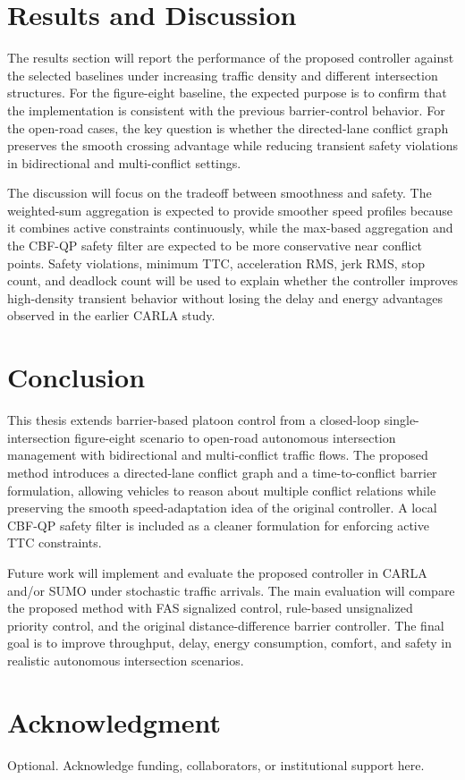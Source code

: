 \documentclass[conference]{IEEEtran}
\begin{document}
\section{Results and Discussion}
The results section will report the performance of the proposed controller against the selected baselines under increasing traffic density and different intersection structures. For the figure-eight baseline, the expected purpose is to confirm that the implementation is consistent with the previous barrier-control behavior. For the open-road cases, the key question is whether the directed-lane conflict graph preserves the smooth crossing advantage while reducing transient safety violations in bidirectional and multi-conflict settings.

The discussion will focus on the tradeoff between smoothness and safety. The weighted-sum aggregation is expected to provide smoother speed profiles because it combines active constraints continuously, while the max-based aggregation and the CBF-QP safety filter are expected to be more conservative near conflict points. Safety violations, minimum TTC, acceleration RMS, jerk RMS, stop count, and deadlock count will be used to explain whether the controller improves high-density transient behavior without losing the delay and energy advantages observed in the earlier CARLA study.

\section{Conclusion}
This thesis extends barrier-based platoon control from a closed-loop single-intersection figure-eight scenario to open-road autonomous intersection management with bidirectional and multi-conflict traffic flows. The proposed method introduces a directed-lane conflict graph and a time-to-conflict barrier formulation, allowing vehicles to reason about multiple conflict relations while preserving the smooth speed-adaptation idea of the original controller. A local CBF-QP safety filter is included as a cleaner formulation for enforcing active TTC constraints.

Future work will implement and evaluate the proposed controller in CARLA and/or SUMO under stochastic traffic arrivals. The main evaluation will compare the proposed method with FAS signalized control, rule-based unsignalized priority control, and the original distance-difference barrier controller. The final goal is to improve throughput, delay, energy consumption, comfort, and safety in realistic autonomous intersection scenarios.

\section*{Acknowledgment}
Optional. Acknowledge funding, collaborators, or institutional support here.



\end{document}
